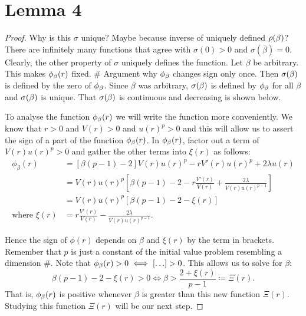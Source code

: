 \section{Lemma 4}
\begin{proof}
Why is this $\sigma$ unique? Maybe because inverse of uniquely defined $\rho(\beta)$?
There are infinitely many functions that agree with $\sigma(0)>0$ and $\sigma(\bar{\beta})=0$. Clearly, the other property of $\sigma$ uniquely defines the function. 
Let $\beta$ be arbitrary. This makes $\phi_{\beta}(r)$ fixed. 
\# Argument why $\phi_{\beta}$ changes sign only once. 
Then $\sigma(\beta)$ is defined by the zero of $\phi_{\beta}$. 
Since $\beta$ was arbitrary, $\sigma(\beta)$ is defined by $\phi_{\beta}$ for all $\beta$ and $\sigma(\beta)$ is unique. 
That $\sigma(\beta)$ is continuous and decreasing is shown below.

To analyse the function $\phi_{\beta}(r)$ we will write the function more conveniently. We know that $r>0$ and $V(r)>0$ and $u(r)^p>0$ and this will allow us to assert the sign of a part of the function $\phi_{\beta}(r)$. In $\phi_{\beta}(r)$, factor out a term of $V(r)u(r)^p>0$ and gather the other terms into $\xi(r)$ as follows:
\begin{align*}
\phi_{\beta}(r)&=\left[\beta(p-1)-2\right]V(r)u(r)^p-rV'(r)u(r)^p+2\lambda u(r) \\ %
&=V(r)u(r)^p\left[\beta(p-1)-2-r\frac{V'(r)}{V(r)}+\frac{2\lambda}{V(r)u(r)^{p-1}}\right]\\ 
&= V(r)u(r)^p\left[\beta(p-1)-2-\xi(r)\right]\\
\text{where }\xi(r)&=r\frac{V'(r)}{V(r)}-\frac{2\lambda}{V(r)u(r)^{p-1}}.
\end{align*}

Hence the sign of $\phi(r)$ depends on $\beta$ and $\xi(r)$ by the term in brackets. Remember that $p$ is just a constant of the initial value problem resembling a dimension \#. Note that $\phi_{\beta}(r)>0 \iff \left[\ldots\right]>0$. This allows us to solve for $\beta$:
$$\beta(p-1)-2-\xi(r)>0\iff\beta>\frac{2+\xi(r)}{p-1}\coloneqq\Xi(r).$$
That is, $\phi_{\beta}(r)$ is positive whenever $\beta$ is greater than this new function $\Xi(r)$. Studying this function $\Xi(r)$ will be our next step.


\end{proof}
